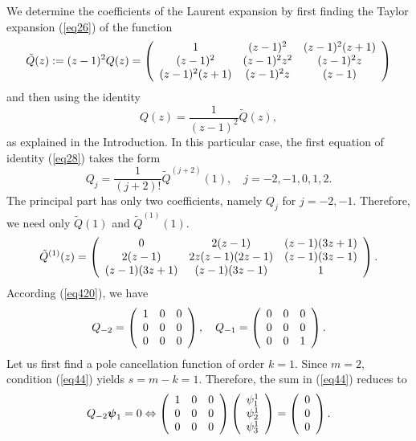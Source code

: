 \documentclass[11pt, reqno]{amsart}
\theoremstyle{plain}
\theoremstyle{remark}
\numberwithin{equation}{section}
\begin{document}
We determine the coefficients of the Laurent expansion by first finding the Taylor expansion (\ref{eq26}) of the function
\[
\tilde{Q}(z):=(z-1)^{2}Q(z)=\left( {\begin{array}{*{20}c}
1 & (z-1)^{2} & (z-1)^{2}(z+1)\\
(z-1)^{2} &  (z-1)^{2}z^{2} & (z-1)^{2}z\\
(z-1)^{2}(z+1) &  (z-1)^{2}z & (z-1)\\
\end{array} } \right)
\]
and then using the identity
\begin{equation}\label{eq418}
Q(z)=\frac{1}{(z-1)^{2}}\tilde{Q}(z),
\end{equation}
as explained in the Introduction. In this particular case, the first equation of identity (\ref{eq28}) takes the form
\begin{equation}\label{eq420}
Q_{j}=\frac{1}{(j+2)!}\tilde{Q}^{(j+2)}(1), \quad j=-2,-1,0,1,2.
\end{equation}
The principal part has only two coefficients, namely $Q_{j}$ for $j=-2,-1$. Therefore, we need only  $\tilde{Q}(1)$ and $\tilde{Q}^{(1)}(1)$.
\[
\tilde{Q}^{(1)}(z)=\left( {\begin{array}{*{20}c}
0 & 2(z-1) & (z-1)(3z+1)\\
2(z-1) &  2z(z-1)(2z-1) & (z-1)(3z-1)\\
(z-1)(3z+1) &  (z-1)(3z-1) & 1\\
\end{array} } \right).
\]
According (\ref{eq420}), we have
\[
Q_{-2}=\left( {\begin{array}{*{20}c}
1 & 0 & 0\\
0 &  0 & 0\\
0 &  0 & 0\\
\end{array} } \right), \quad
Q_{-1}=\left( {\begin{array}{*{20}c}
0 & 0 & 0\\
0 &  0 & 0\\
0 &  0 & 1\\
\end{array} } \right).
\]
Let us first find a pole cancellation function of order $k = 1$. Since $m = 2$, condition (\ref{eq44}) yields $s = m - k = 1$. Therefore, the sum in (\ref{eq44}) reduces to
\begin{equation}\label{eq422}
Q_{-2}\boldsymbol{\psi}_{1}=0 \Leftrightarrow \left( {\begin{array}{*{20}c}
1 & 0 & 0\\
0 &  0 & 0\\
0 &  0 &0\\
\end{array} } \right)\left( {\begin{array}{*{20}c}
\psi_{1}^{1} \\
\psi_{2}^{1} \\
\psi_{3}^{1}\\
\end{array} } \right)=\left( {\begin{array}{*{20}c}
0 \\
0 \\
0\\
\end{array} } \right). 
\end{equation}
\end{document}
